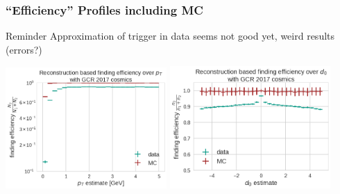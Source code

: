 \documentclass[18pt]{beamer}
\begin{document}
  \begin{frame}
    \frametitle{``Efficiency'' Profiles including MC}
    \begin{alertblock}{Reminder}
      Approximation of trigger in data seems not good yet, weird results (errors?)
    \end{alertblock}
    \begin{center}
      \includegraphics[width=0.46\textwidth]{figures/findeff_pt_data_mc.png}
      \includegraphics[width=0.46\textwidth]{figures/findeff_d0_data_mc.png}
    \end{center}
  \end{frame}
  
\end{document}

